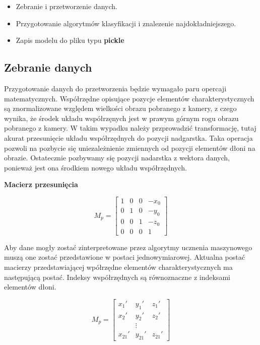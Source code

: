\begin{itemize}
    \item Zebranie i przetworzenie danych. 
    \item Przygotowanie algorytmów klasyfikacji i znalezenie najdokładniejszego. 
    \item Zapis modelu do pliku typu \textbf{pickle}
\end{itemize}

\subsection{Zebranie danych}

\quad Przygotowanie danych do przetworzenia będzie wymagało paru opercaji matematycznych. Współrzędne opisujące pozycje elementów charakterystycznych są znormalizowane względem wielkości obrazu pobranego z kamery, z czego wynika, że środek układu współrzęnych jest w prawym górnym rogu obrazu pobranego z kamery. W takim wypadku należy przprowadzić transformację, tutaj akurat przesunięcie układu współrzędnych do pozycji nadgarstka. Taka operacja pozwoli na pozbycie się uniezależnienie zmiennych od pozycji elementów dłoni na obrazie. Ostatecznie pozbywamy się pozycji nadarstka z wektora danych, ponieważ jest ona środkiem nowego układu współrzędnych. 

\quad \textbf{Macierz przesunięcia}

\begin{equation*}
    M_p = 
    \begin{bmatrix}
    1 & 0 & 0 & -x_0 \\
    0 & 1 & 0 & -y_0 \\
    0 & 0 & 1 & -z_0 \\
    0 & 0 & 0 & 1
    \end{bmatrix}
\end{equation*}

\quad Aby dane mogły zostać zinterpretowane przez algorytmy ucznenia maszynowego muszą one zostać przedstawione w postaci jednowymiarowej. Aktualna postać macierzy przedstawiającej wpółrzędne elementów charakterystycznych ma następującą postać. Indeksy współrzędnych są równoznaczne z indeksami elementów dłoni. 

\begin{equation*}
    M_p = 
    \begin{bmatrix}
    x_1' & y_1' & z_1' \\
    x_2' & y_2' & z_2' \\
     & \vdots &     \\
    x_{21}' & y_{21}' & z_{21}'
    \end{bmatrix}
\end{equation*}

